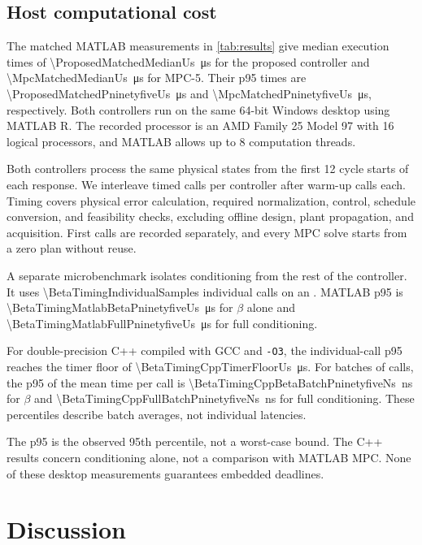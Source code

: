 \documentclass[pdflatex,iicol,sn-mathphys-ay]{sn-jnl}
\begin{document}
\subsection{Host computational cost}
\label{sec:computational-cost}

The matched MATLAB measurements in \cref{tab:results} give median execution times of \SI{\ProposedMatchedMedianUs}{\micro\second} for the proposed controller and \SI{\MpcMatchedMedianUs}{\micro\second} for MPC-5. Their p95 times are \SI{\ProposedMatchedPninetyfiveUs}{\micro\second} and \SI{\MpcMatchedPninetyfiveUs}{\micro\second}, respectively. Both controllers run on the same 64-bit Windows desktop using MATLAB R\MatchedTimingMatlabRelease{}. The recorded processor is an AMD Family 25 Model 97 with 16 logical processors, and MATLAB allows up to 8 computation threads.

Both controllers process the same \MatchedTimingStates{} physical states from the first 12 cycle starts of each response. We interleave \MatchedTimingSamples{} timed calls per controller after \MatchedTimingWarmup{} warm-up calls each. Timing covers physical error calculation, required normalization, control, schedule conversion, and feasibility checks, excluding offline design, plant propagation, and acquisition. First calls are recorded separately, and every MPC solve starts from a zero plan without reuse.

A separate microbenchmark isolates conditioning from the rest of the controller. It uses \num{\BetaTimingIndividualSamples} individual calls on an \BetaTimingCpu{}. MATLAB p95 is \SI{\BetaTimingMatlabBetaPninetyfiveUs}{\micro\second} for $\beta$ alone and \SI{\BetaTimingMatlabFullPninetyfiveUs}{\micro\second} for full conditioning.

For double-precision C++ compiled with GCC \BetaTimingGccVersion{} and \texttt{-O3}, the individual-call p95 reaches the timer floor of \SI{\BetaTimingCppTimerFloorUs}{\micro\second}. For batches of \BetaTimingBatchSize{} calls, the p95 of the mean time per call is \SI{\BetaTimingCppBetaBatchPninetyfiveNs}{\nano\second} for $\beta$ and \SI{\BetaTimingCppFullBatchPninetyfiveNs}{\nano\second} for full conditioning. These percentiles describe batch averages, not individual latencies.

The p95 is the observed 95th percentile, not a worst-case bound. The C++ results concern conditioning alone, not a comparison with MATLAB MPC. None of these desktop measurements guarantees embedded deadlines.

\section{Discussion}
\end{document}
